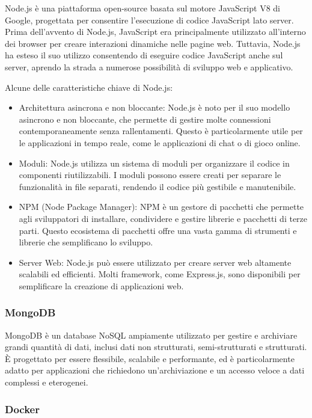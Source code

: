 \documentclass[12pt]{article}
\begin{document}
Node.js è una piattaforma open-source basata sul motore JavaScript V8 di Google, progettata per consentire l'esecuzione di codice JavaScript lato server. Prima dell'avvento di Node.js, JavaScript era principalmente utilizzato all'interno dei browser per creare interazioni dinamiche nelle pagine web. Tuttavia, Node.js ha esteso il suo utilizzo consentendo di eseguire codice JavaScript anche sul server, aprendo la strada a numerose possibilità di sviluppo web e applicativo.

Alcune delle caratteristiche chiave di Node.js:

\begin{itemize}
    \item Architettura asincrona e non bloccante: Node.js è noto per il suo modello asincrono e non bloccante, che permette di gestire molte connessioni contemporaneamente senza rallentamenti. Questo è particolarmente utile per le applicazioni in tempo reale, come le applicazioni di chat o di gioco online.
    \item Moduli: Node.js utilizza un sistema di moduli per organizzare il codice in componenti riutilizzabili. I moduli possono essere creati per separare le funzionalità in file separati, rendendo il codice più gestibile e manutenibile.
    \item NPM (Node Package Manager): NPM è un gestore di pacchetti che permette agli sviluppatori di installare, condividere e gestire librerie e pacchetti di terze parti. Questo ecosistema di pacchetti offre una vasta gamma di strumenti e librerie che semplificano lo sviluppo.
    \item Server Web: Node.js può essere utilizzato per creare server web altamente scalabili ed efficienti. Molti framework, come Express.js, sono disponibili per semplificare la creazione di applicazioni web.
\end{itemize}

\subsubsection{MongoDB}

MongoDB è un database NoSQL ampiamente utilizzato per gestire e archiviare grandi quantità di dati, inclusi dati non strutturati, semi-strutturati e strutturati. È progettato per essere flessibile, scalabile e performante, ed è particolarmente adatto per applicazioni che richiedono un'archiviazione e un accesso veloce a dati complessi e eterogenei.

\subsubsection{Docker}
\end{document}
